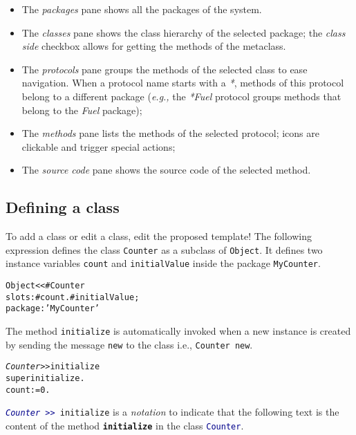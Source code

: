 \documentclass[notumble]{leaflet}
\makeatletter
\newcommand{\eg}{\emph{e.g.,}\xspace}
\newenvironment{displaycode}{%
     \par
     \hspace{1.5em}\begin{minipage}{\linewidth}
       \begin{alltt}\small}{
       \end{alltt}
     \end{minipage}
     \par}
\newcommand{\code}[1]{\foreignlanguage{english}{\texttt{#1}}}
\makeatother
\begin{document}
\begin{itemize}
\item The \emph{packages} pane shows all the packages of the system.
\item The \emph{classes} pane shows the class hierarchy of the
  selected package; the \emph{class side} checkbox allows for getting
  the methods of the metaclass.
\item The \emph{protocols} pane groups the methods of the selected
  class to ease navigation.  When a protocol name starts with a \emph{*}, methods of this
  protocol belong to a different package (\eg the \emph{*Fuel}
  protocol groups methods that belong to the \emph{Fuel} package);
\item The \emph{methods} pane lists the methods of the selected
  protocol; icons are clickable and trigger special actions;
\item The \emph{source code} pane shows the source code of the
  selected method. 
\end{itemize}

\vspace{-0.3cm}
\subsection{Defining a class}
To add a class or edit a class, edit the proposed template!
The following expression defines the class \code{Counter} as a subclass of \code{Object}.
It defines two instance variables \code{count} and \code{initialValue} inside the package \code{MyCounter}.

\begin{displaycode}
Object << #Counter
   slots: { #count . #initialValue};
   package: 'MyCounter'
\end{displaycode}

The method \code{initialize} is automatically invoked when a new instance is created by sending the message \code{new} to the class i.e., \code{Counter new}.   

\begin{displaycode}
\textit{Counter >>} initialize 
    super initialize.
    count := 0. 
\end{displaycode}

\code{\textcolor{darkBlue}{\textit{Counter}\,>{}>\,}initialize} is a \textit{notation} to indicate that the following text is the content of the method \code{\textbf{initialize}} in the class \code{\textcolor{darkBlue}{Counter}}.

\vspace{-0.3cm}
\end{document}
